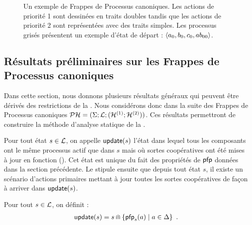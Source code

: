\begin{example}
\begin{figure}[ht]
{
    }
    \caption{%
      Un exemple de Frappes de Processus canoniques.
      Les actions de priorité 1 sont dessinées en traits doubles tandis que les actions
      de priorité 2 sont représentées avec des traits simples.
      Les processus grisés présentent un exemple d'état de départ :
      $\mbox{$\langle a_0, b_0, c_0, ab_{00} \rangle$}$.
    }
  \end{figure}
\end{example}




\subsection{Résultats préliminaires sur les Frappes de Processus canoniques}

Dans cette section, nous donnons plusieurs résultats généraux qui peuvent être dérivés des
restrictions de la .
Nous considérons donc dans la suite des Frappes de Processus
canoniques $\mathcal{PH} = (\Sigma; \mathcal{L}; (\mathcal{H}^{(1)}; \mathcal{H}^{(2)}))$.
Ces résultats permettront de construire la méthode d'analyse statique de la .

Pour tout état $s \in \mathcal{L}$, on appelle $\mathsf{update}(s)$ l'état dans lequel tous les composants
ont le même processus actif que dans $s$
mais où sortes coopératives ont été mises à jour en fonction ().
Cet état est unique du fait des propriétés de $\mathsf{pfp}$ données dans la section précédente.
Le  stipule ensuite que depuis tout état $s$, il existe un scénario d'actions primaires
mettant à jour toutes les sortes coopératives de façon à arriver dans $\mathsf{update}(s)$.

\begin{definition}[$\update : \PHl \rightarrow \PHl$]
  Pour tout $s \in \mathcal{L}$, on définit :
  \begin{align*}
    \mathsf{update}(s) = s \Cap \{ \mathsf{pfp}_{s}(a) \mid a \in \Delta \} \enspace.
  \end{align*}
\end{definition}

